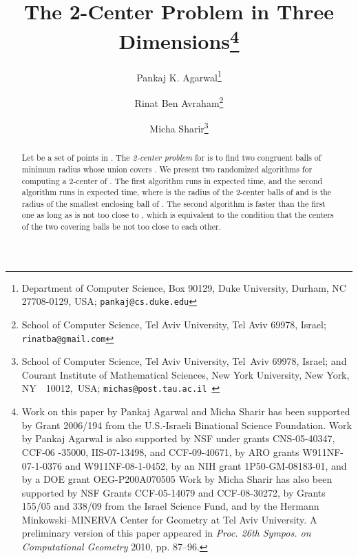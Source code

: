 \documentclass[a4paper,12pt]{article}
\begin{document}
\begin{titlepage}

\title{The 2-Center Problem in Three Dimensions{\large{\thanks{Work on this paper by Pankaj Agarwal and Micha Sharir has been
supported by Grant 2006/194 from the U.S.-Israeli Binational Science
Foundation. Work by Pankaj Agarwal is also supported by NSF under
grants
 CNS-05-40347, CCF-06 -35000, IIS-07-13498,
                and CCF-09-40671, by ARO grants
                W911NF-07-1-0376 and W911NF-08-1-0452, by an
                NIH grant 1P50-GM-08183-01, and by a DOE grant
                OEG-P200A070505
Work by Micha Sharir has also been supported
by NSF Grants CCF-05-14079 and CCF-08-30272,
by Grants 155/05 and 338/09 from the Israel Science Fund,
and by the Hermann Minkowski--MINERVA Center for Geometry at Tel Aviv
University. A preliminary version of this paper appeared in {\it Proc. 26th Sympos. on Computational Geometry} 2010, pp. 87--96.
  }}}}





\author{
  Pankaj K. Agarwal\thanks{Department of Computer Science, Box 90129, Duke University,
      Durham, NC 27708-0129, USA; {\tt pankaj@cs.duke.edu}}
       \and
       Rinat Ben Avraham\thanks{School of Computer Science, Tel Aviv University, Tel Aviv 69978,
          Israel; {\tt rinatba@gmail.com}}
       \and
       Micha Sharir\thanks{School of Computer Science, Tel Aviv University, Tel~Aviv 69978,
          Israel; and Courant Institute of Mathematical Sciences, New York
          University, New York, NY~~10012,~USA; {\tt michas@post.tau.ac.il }}
 }
\date{}
\maketitle

\begin{abstract}
Let  be a set of  points in .  The \emph{2-center
problem} for  is to find two congruent balls of minimum radius
whose union covers . We present two randomized algorithms for
computing a 2-center of . The first  algorithm runs in
 expected time, and the second algorithm runs in
 expected time, where  is the
radius of the 2-center balls of  and  is the radius of the
smallest enclosing ball of . The second algorithm is faster than
the first one as long as  is not too close to , which is
equivalent to the condition that the centers of the two covering
balls be not too close to each other.
\end{abstract}

\end{titlepage}
\end{document}
